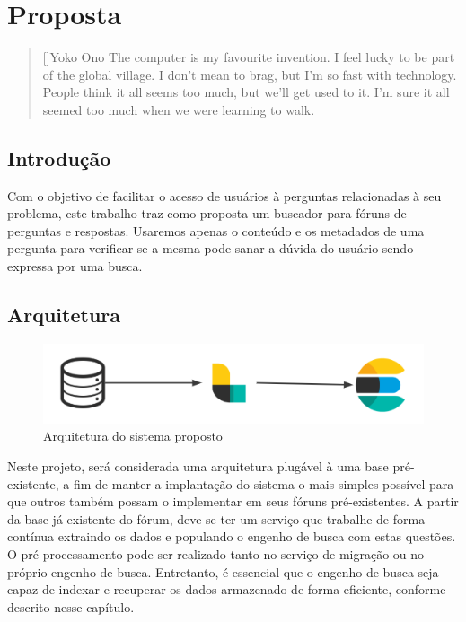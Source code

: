 \chapter{Proposta}
\label{cap:project}

\begin{quotation}[]{Yoko Ono}
The computer is my favourite invention. I feel lucky to be part of the global village. I don't mean to brag, but I'm so fast with technology. People think it all seems too much, but we'll get used to it. I'm sure it all seemed too much when we were learning to walk.
\end{quotation}

\section{Introdução}
Com o objetivo de facilitar o acesso de usuários à perguntas relacionadas à seu problema, este trabalho traz como proposta um buscador para fóruns de perguntas e respostas. Usaremos apenas o conteúdo e os metadados de uma pergunta para verificar se a mesma pode sanar a dúvida do usuário sendo expressa por uma busca.
\section{Arquitetura}
\begin{figure}[htb]
	\centering
	\includegraphics[width=\textwidth]{chapters/project/architecture.png}
	\caption{Arquitetura do sistema proposto}
\end{figure}
Neste projeto, será considerada uma arquitetura plugável à uma base pré-existente, a fim de manter a implantação do sistema o mais simples possível para que outros também possam o implementar em seus fóruns pré-existentes. 
A partir da base já existente do fórum, deve-se ter um serviço que trabalhe de forma contínua extraindo os dados e populando o engenho de busca com estas questões. O pré-processamento pode ser realizado tanto no serviço de migração ou no próprio engenho de busca. Entretanto, é essencial que o engenho de busca seja capaz de indexar e recuperar os dados armazenado de forma eficiente, conforme descrito nesse capítulo.

